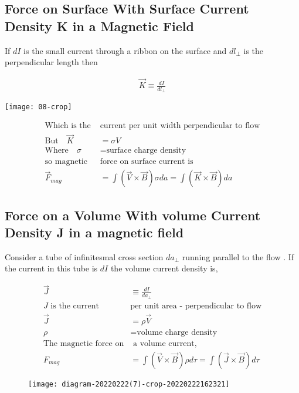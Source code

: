 \subsection{Force on Surface With Surface Current Density K in a Magnetic Field}
If $d I$ is the small current through a ribbon on the surface and $d l_{\perp}$ is the perpendicular length then \\
\begin{minipage}{.40\textwidth}
	\begin{align*}
	\vec{K} \equiv \frac{d I}{d l_{\perp}}
	\end{align*}
\end{minipage}
\begin{minipage}{.30\textwidth}
	\texttt{[image: 08-crop]}
\end{minipage}
\begin{align*}
\text{Which is the }&\text{current per unit width perpendicular to flow}\\
\text{But} \quad \vec{K}&=\sigma V\\
\text{Where} \quad \sigma&= \text{surface charge density}\\
\text{so magnetic }&\text{force on surface current is}\\
\vec{F}_{m a g}&=\int(\vec{V} \times \vec{B}) \sigma d a=\int(\vec{K} \times \vec{B}) d a
\end{align*}
\subsection{Force on a Volume With volume Current Density J in a magnetic field}
Consider a tube of infinitesmal cross section $da_\perp$ running parallel to the flow . If the current in this tube is $dI$ the volume current density is,\\
\begin{minipage}{0.6\textwidth}
\begin{align*}
\vec{J} &\equiv \frac{d I}{d a_{\perp}}\\
\text{$J$ is the current }&\text{per unit area - perpendicular to flow}\\
\vec{J}&=\rho \vec{V}\\
\rho&= \text{volume charge density}\\
\text{The magnetic force  on}&\text{ a volume current,}\\
F_{mag}&=\int(\vec{V} \times \vec{B}) \rho d \tau=\int(\vec{J} \times \vec{B}) d \tau
\end{align*}
\end{minipage}
\begin{minipage}{0.5\textwidth}
\begin{figure}[H]
	\centering
	\texttt{[image: diagram-20220222(7)-crop-20220222162321]}
	\caption{}
	\label{}
\end{figure}	
\end{minipage}

